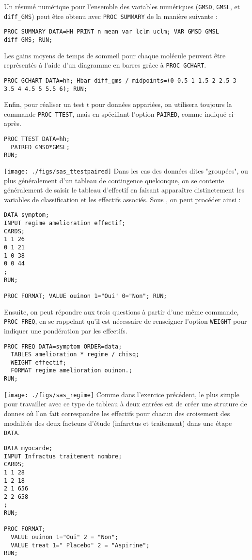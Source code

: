 Un résumé numérique pour l'ensemble des variables numériques (\texttt{GMSD},
\texttt{GMSL}, et \verb|diff_GMS|) peut être obtenu avec \texttt{PROC SUMMARY} 
de la manière suivante :
\begin{verbatim}
PROC SUMMARY DATA=HH PRINT n mean var lclm uclm; VAR GMSD GMSL diff_GMS; RUN;
\end{verbatim}

Les gains moyens de temps de sommeil pour chaque molécule peuvent être
représentés à l'aide d'un diagramme en barres grâce à \texttt{PROC GCHART}.
\begin{verbatim}
PROC GCHART DATA=hh; Hbar diff_gms / midpoints=(0 0.5 1 1.5 2 2.5 3 3.5 4 4.5 5 5.5 6); RUN;
\end{verbatim}

Enfin, pour réaliser un test $t$ pour données appariées, on utilisera toujours la
commande \texttt{PROC TTEST}, mais en spécifiant l'option \texttt{PAIRED},
comme indiqué ci-après.
\begin{verbatim}
PROC TTEST DATA=hh;
  PAIRED GMSD*GMSL;
RUN;
\end{verbatim}

\texttt{[image: ./figs/sas\_ttestpaired]}
%
%
%
\soln{\ref{exo:9.3}}
Dans les cas des données dites "groupées", ou plus généralement d'un tableau
de contingence quelconque, on se contente généralement de saisir le tableau
d'effectif en faisant apparaître distinctement les variables de
classification et les effectifs associés. Sous \SAS, on peut procéder ainsi :
\begin{verbatim}
DATA symptom;
INPUT regime amelioration effectif;
CARDS;
1 1 26
0 1 21
1 0 38
0 0 44
;
RUN;

PROC FORMAT; VALUE ouinon 1="Oui" 0="Non"; RUN;
\end{verbatim}

Ensuite, on peut répondre aux trois questions à partir d'une même commande,
\texttt{PROC FREQ}, en se rappelant qu'il est nécessaire de renseigner
l'option \texttt{WEIGHT} pour indiquer une pondération par les effectifs.
\begin{verbatim}
PROC FREQ DATA=symptom ORDER=data;
  TABLES amelioration * regime / chisq;
  WEIGHT effectif;
  FORMAT regime amelioration ouinon.;
RUN;
\end{verbatim}

\texttt{[image: ./figs/sas\_regime]}
%
%
%
\soln{\ref{exo:9.4}}
Comme dans l'exercice précédent, le plus simple pour travailler avec ce type
de tableau à deux entrées est de créer une struture de donnes où l'on fait
correspondre les effectifs pour chacun des croisement des modalités des deux
facteurs d'étude (infarctus et traitement) dans une étape \texttt{DATA}.
\begin{verbatim}
DATA myocarde;
INPUT Infractus traitement nombre;
CARDS;
1 1 28
1 2 18
2 1 656
2 2 658
;
RUN;

PROC FORMAT; 
  VALUE ouinon 1="Oui" 2 = "Non";
  VALUE treat 1=" Placebo" 2 = "Aspirine";
RUN;
\end{verbatim}

